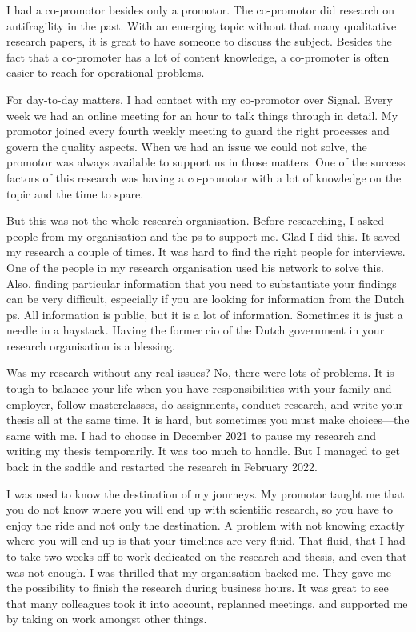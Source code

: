 I had a co-promotor besides only a promotor. The co-promotor did research on \gls{antifragility} in the past. With an emerging topic without that many qualitative research papers, it is great to have someone to discuss the subject. Besides the fact that a co-promoter has a lot of content knowledge, a co-promoter is often easier to reach for operational problems. 

For day-to-day matters, I had contact with my co-promotor over Signal. Every week we had an online meeting for an hour to talk things through in detail. My promotor joined every fourth weekly meeting to guard the right processes and govern the quality aspects. When we had an issue we could not solve, the promotor was always available to support us in those matters. One of the success factors of this research was having a co-promotor with a lot of knowledge on the topic and the time to spare.

But this was not the whole research organisation. Before researching, I asked people from my organisation and the \gls{ps} to support me. Glad I did this. It saved my research a couple of times. It was hard to find the right people for interviews. One of the people in my research organisation used his network to solve this. Also, finding particular information that you need to substantiate your findings can be very difficult, especially if you are looking for information from the Dutch \gls{ps}. All information is public, but it is a lot of information. Sometimes it is just a needle in a haystack. Having the former \acrshort{cio} of the Dutch government in your research organisation is a blessing.

Was my research without any real issues? No, there were lots of problems. It is tough to balance your life when you have responsibilities with your family and employer, follow masterclasses, do assignments, conduct research, and write your thesis all at the same time. It is hard, but sometimes you must make choices—the same with me. I had to choose in December 2021 to pause my research and writing my thesis temporarily. It was too much to handle. But I managed to get back in the saddle and restarted the research in February 2022.

I was used to know the destination of my journeys. My promotor taught me that you do not know where you will end up with scientific research, so you have to enjoy the ride and not only the destination. A problem with not knowing exactly where you will end up is that your timelines are very fluid. That fluid, that I had to take two weeks off to work dedicated on the research and thesis, and even that was not enough. I was thrilled that my organisation backed me. They gave me the possibility to finish the research during business hours. It was great to see that many colleagues took it into account, replanned meetings, and supported me by taking on work amongst other things. 

